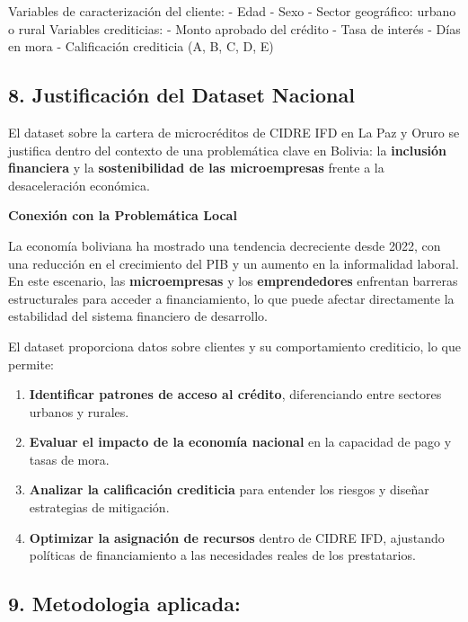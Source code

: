 \documentclass[Royal,times,sageh]{sagej}
\begin{document}
Variables de caracterización del cliente: - Edad - Sexo - Sector
geográfico: urbano o rural Variables crediticias: - Monto aprobado del
crédito - Tasa de interés - Días en mora - Calificación crediticia (A,
B, C, D, E)

\subsection{\texorpdfstring{\textbf{8. Justificación del Dataset
Nacional}}{8. Justificación del Dataset Nacional}}\label{justificaciuxf3n-del-dataset-nacional}

El dataset sobre la cartera de microcréditos de CIDRE IFD en La Paz y
Oruro se justifica dentro del contexto de una problemática clave en
Bolivia: la \textbf{inclusión financiera} y la \textbf{sostenibilidad de
las microempresas} frente a la desaceleración económica.

\textbf{Conexión con la Problemática Local}

La economía boliviana ha mostrado una tendencia decreciente desde 2022,
con una reducción en el crecimiento del PIB y un aumento en la
informalidad laboral. En este escenario, las \textbf{microempresas} y
los \textbf{emprendedores} enfrentan barreras estructurales para acceder
a financiamiento, lo que puede afectar directamente la estabilidad del
sistema financiero de desarrollo.

El dataset proporciona datos sobre clientes y su comportamiento
crediticio, lo que permite:

\begin{enumerate}
\def\labelenumi{\arabic{enumi}.}
\item
  \textbf{Identificar patrones de acceso al crédito}, diferenciando
  entre sectores urbanos y rurales.
\item
  \textbf{Evaluar el impacto de la economía nacional} en la capacidad de
  pago y tasas de mora.
\item
  \textbf{Analizar la calificación crediticia} para entender los riesgos
  y diseñar estrategias de mitigación.
\item
  \textbf{Optimizar la asignación de recursos} dentro de CIDRE IFD,
  ajustando políticas de financiamiento a las necesidades reales de los
  prestatarios.
\end{enumerate}

\subsection{\texorpdfstring{9. \textbf{Metodologia
aplicada:}}{9. Metodologia aplicada:}}\label{metodologia-aplicada}
\end{document}

